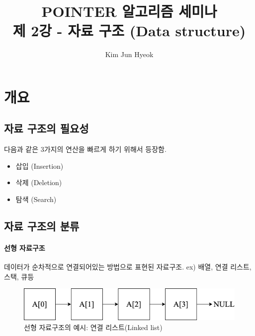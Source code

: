 \documentclass{article}
\begin{document}
    \title{%
        POINTER 알고리즘 세미나 \\
        \large 제 2강 - 자료 구조 (Data structure)}
    \author{Kim Jun Hyeok}
    \maketitle
    \linespread{1.25}
    \section{개요}
        \subsection{자료 구조의 필요성}
        다음과 같은 3가지의 연산을 빠르게 하기 위해서 등장함.
        \begin{itemize}
            \item 삽입 (Insertion)
            \item 삭제 (Deletion)
            \item 탐색 (Search)
        \end{itemize}
        \subsection{자료 구조의 분류}
        \paragraph{선형 자료구조} 데이터가 순차적으로 연결되어있는 방법으로 표현된 자료구조.
        ex) 배열, 연결 리스트, 스택, 큐등
        \begin{figure}[h]
            \centering
            \includegraphics[width=\textwidth]{Linear_Structure.png}
            \caption{선형 자료구조의 예시: 연결 리스트(Linked list)}
            \label{}
        \end{figure}
        \newpage
\end{document}
